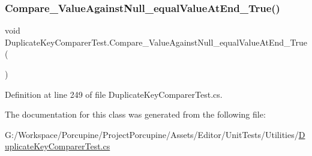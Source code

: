 \subsubsection{\texorpdfstring{Compare\+\_\+\+Value\+Against\+Null\+\_\+equal\+Value\+At\+End\+\_\+\+True()}{Compare\_ValueAgainstNull\_equalValueAtEnd\_True()}}
{\footnotesize\ttfamily void Duplicate\+Key\+Comparer\+Test.\+Compare\+\_\+\+Value\+Against\+Null\+\_\+equal\+Value\+At\+End\+\_\+\+True (\begin{DoxyParamCaption}{ }\end{DoxyParamCaption})}



Definition at line 249 of file Duplicate\+Key\+Comparer\+Test.\+cs.



The documentation for this class was generated from the following file\+:\begin{DoxyCompactItemize}
\item 
G\+:/\+Workspace/\+Porcupine/\+Project\+Porcupine/\+Assets/\+Editor/\+Unit\+Tests/\+Utilities/\hyperlink{_duplicate_key_comparer_test_8cs}{Duplicate\+Key\+Comparer\+Test.\+cs}\end{DoxyCompactItemize}
